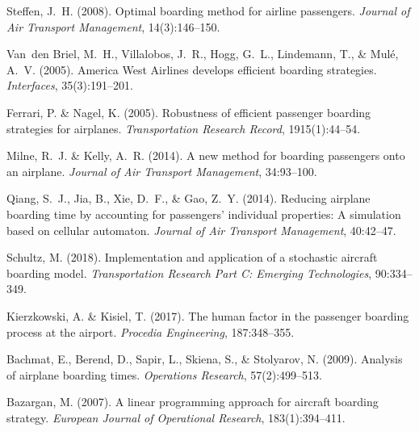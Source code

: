 \documentclass[a4paper,12pt]{article}
\begin{document}

\begin{thebibliography}{10}

Steffen, J.~H. (2008).
\newblock Optimal boarding method for airline passengers.
\newblock \emph{Journal of Air Transport Management}, 14(3):146--150.

Van~den Briel, M.~H., Villalobos, J.~R., Hogg, G.~L., Lindemann, T., \& Mul{\'e}, A.~V. (2005).
\newblock America West Airlines develops efficient boarding strategies.
\newblock \emph{Interfaces}, 35(3):191--201.

Ferrari, P. \& Nagel, K. (2005).
\newblock Robustness of efficient passenger boarding strategies for airplanes.
\newblock \emph{Transportation Research Record}, 1915(1):44--54.

Milne, R.~J. \& Kelly, A.~R. (2014).
\newblock A new method for boarding passengers onto an airplane.
\newblock \emph{Journal of Air Transport Management}, 34:93--100.

Qiang, S.~J., Jia, B., Xie, D.~F., \& Gao, Z.~Y. (2014).
\newblock Reducing airplane boarding time by accounting for passengers' individual properties: A simulation based on cellular automaton.
\newblock \emph{Journal of Air Transport Management}, 40:42--47.

Schultz, M. (2018).
\newblock Implementation and application of a stochastic aircraft boarding model.
\newblock \emph{Transportation Research Part C: Emerging Technologies}, 90:334--349.

Kierzkowski, A. \& Kisiel, T. (2017).
\newblock The human factor in the passenger boarding process at the airport.
\newblock \emph{Procedia Engineering}, 187:348--355.

Bachmat, E., Berend, D., Sapir, L., Skiena, S., \& Stolyarov, N. (2009).
\newblock Analysis of airplane boarding times.
\newblock \emph{Operations Research}, 57(2):499--513.

Bazargan, M. (2007).
\newblock A linear programming approach for aircraft boarding strategy.
\newblock \emph{European Journal of Operational Research}, 183(1):394--411.

\end{thebibliography}
\end{document}
